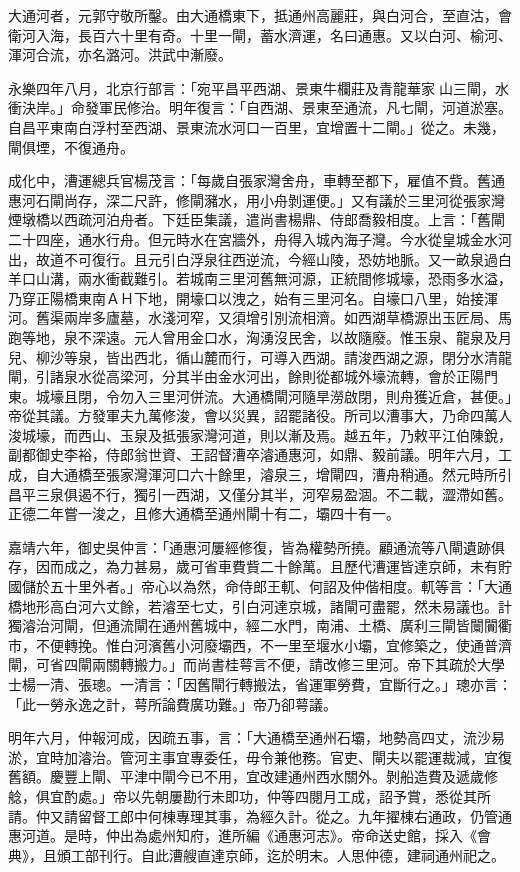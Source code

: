 大通河者，元郭守敬所鑿。由大通橋東下，抵通州高麗莊，與白河合，至直沽，會衛河入海，長百六十里有奇。十里一閘，蓄水濟運，名曰通惠。又以白河、榆河、渾河合流，亦名潞河。洪武中漸廢。

永樂四年八月，北京行部言：「宛平昌平西湖、景東牛欄莊及青龍華家𠂅山三閘，水衝決岸。」命發軍民修治。明年復言：「自西湖、景東至通流，凡七閘，河道淤塞。自昌平東南白浮村至西湖、景東流水河口一百里，宜增置十二閘。」從之。未幾，閘俱堙，不復通舟。

成化中，漕運總兵官楊茂言：「每歲自張家灣舍舟，車轉至都下，雇值不貲。舊通惠河石閘尚存，深二尺許，修閘瀦水，用小舟剝運便。」又有議於三里河從張家灣煙墩橋以西疏河泊舟者。下廷臣集議，遣尚書楊鼎、侍郎喬毅相度。上言：「舊閘二十四座，通水行舟。但元時水在宮牆外，舟得入城內海子灣。今水從皇城金水河出，故道不可復行。且元引白浮泉往西逆流，今經山陵，恐妨地脈。又一畝泉過白羊口山溝，兩水衝截難引。若城南三里河舊無河源，正統間修城壕，恐雨多水溢，乃穿正陽橋東南ＡＨ下地，開壕口以洩之，始有三里河名。自壕口八里，始接渾河。舊渠兩岸多廬墓，水淺河窄，又須增引別流相濟。如西湖草橋源出玉匠局、馬跑等地，泉不深遠。元人曾用金口水，洶湧沒民舍，以故隨廢。惟玉泉、龍泉及月兒、柳沙等泉，皆出西北，循山麓而行，可導入西湖。請浚西湖之源，閉分水清龍閘，引諸泉水從高梁河，分其半由金水河出，餘則從都城外壕流轉，會於正陽門東。城壕且閉，令勿入三里河併流。大通橋閘河隨旱澇啟閉，則舟獲近倉，甚便。」帝從其議。方發軍夫九萬修浚，會以災異，詔罷諸役。所司以漕事大，乃命四萬人浚城壕，而西山、玉泉及抵張家灣河道，則以漸及焉。越五年，乃敕平江伯陳銳，副都御史李裕，侍郎翁世資、王詔督漕卒濬通惠河，如鼎、毅前議。明年六月，工成，自大通橋至張家灣渾河口六十餘里，濬泉三，增閘四，漕舟稍通。然元時所引昌平三泉俱遏不行，獨引一西湖，又僅分其半，河窄易盈涸。不二載，澀滯如舊。正德二年嘗一浚之，且修大通橋至通州閘十有二，壩四十有一。

嘉靖六年，御史吳仲言：「通惠河屢經修復，皆為權勢所撓。顧通流等八閘遺跡俱存，因而成之，為力甚易，歲可省車費貲二十餘萬。且歷代漕運皆達京師，未有貯國儲於五十里外者。」帝心以為然，命侍郎王軏、何詔及仲偕相度。軏等言：「大通橋地形高白河六丈餘，若濬至七丈，引白河達京城，諸閘可盡罷，然未易議也。計獨濬治河閘，但通流閘在通州舊城中，經二水門，南浦、土橋、廣利三閘皆闤闠衢市，不便轉挽。惟白河濱舊小河廢壩西，不一里至堰水小壩，宜修築之，使通普濟閘，可省四閘兩關轉搬力。」而尚書桂萼言不便，請改修三里河。帝下其疏於大學士楊一清、張璁。一清言：「因舊閘行轉搬法，省運軍勞費，宜斷行之。」璁亦言：「此一勞永逸之計，萼所論費廣功難。」帝乃卻萼議。

明年六月，仲報河成，因疏五事，言：「大通橋至通州石壩，地勢高四丈，流沙易淤，宜時加濬治。管河主事宜專委任，毋令兼他務。官吏、閘夫以罷運裁減，宜復舊額。慶豐上閘、平津中閘今已不用，宜改建通州西水關外。剝船造費及遞歲修艌，俱宜酌處。」帝以先朝屢勘行未即功，仲等四閱月工成，詔予賞，悉從其所請。仲又請留督工郎中何棟專理其事，為經久計。從之。九年擢棟右通政，仍管通惠河道。是時，仲出為處州知府，進所編《通惠河志》。帝命送史館，採入《會典》，且頒工部刊行。自此漕艘直達京師，迄於明末。人思仲德，建祠通州祀之。

